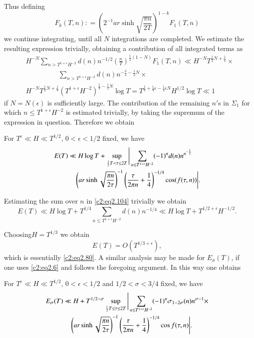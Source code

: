 Thus defining
$$ 
F_k (T, n) : = \left(2^{-1} ar \sinh \sqrt{\frac{\pi  n}{2T}}\right)^{1-k} F_1 (T, n)
$$
we continue integrating, until all $N$ integrations are completed. We
estimate the resulting expression trivially, obtaining a contribution
of all integrated terms as
\begin{align*}
  & H^{-N} \sum_{n > T^{1+ \epsilon} H^{-2}} d(n)n^{-1/2}
  \left(\frac{n}{T} \right)^{\frac{1}{2} (1-N)} F_1 (T, n) \ll H^{-N}T^{\frac{1}{2} N
    + \frac{1}{4}}\times\\ 
  & \hspace{2cm}\sum_{n > T^{1+ \epsilon} H^{-2}} d(n) n^{-\frac{3}{4} - \frac{1}{2} N}\times\\
  & H^{-N} T^{\frac{1}{2} N+ \frac{1}{4}}(T^{1+ \epsilon}H^{-2})^{\frac{1}{4} - \frac{1}{2} N} \log T
  = T^{\frac{1}{2} + \frac{1}{4} \epsilon - \frac{1}{2} \epsilon N} H^{1/2} \log T \ll 1 
\end{align*}
if $N= N(\epsilon)$ is sufficiently large. The contribution of the
remaining $n'$s in $\Sigma_1$ for which $n \leq T^{1+ \epsilon}
H^{-2}$ is estimated trivially, by taking the supremum of the
expression in question. Therefore we obtain

\begin{thm}\label{c2:thm2.7}
  For $T^\epsilon \ll H \ll T^{1/2}$, $0 < \epsilon < 1/2$ fixed, we
  have
\begin{align}
E(T)&\ll H \log T+  \sup\limits_{\frac{1}{2} T < \tau \leq 2T} 
\Bigg| \sum_{n \leq T^{1+\epsilon}H^{-2}} (-1)^n d(n) n^{n^{-\frac{1}{2}}}\notag\\
&\quad\left(ar \sinh\sqrt{\frac{\pi n}{2 \tau}} \right)^{-1}
\left(\frac{\tau}{2 \pi n} +  
\frac{1}{4}\right)^{-1/4} \cos (f(\tau, n)) \Bigg|.\label{c2:eq2.104}
\end{align}
\end{thm}

Estimating the sum over $n$ in \eqref{c2:eq2.104} trivially we obtain 
$$
E(T) \ll H \log T + T^{1/4} \sum_{n \leq T^{1+ \epsilon}H^{-2}} d(n)
n^{-1/4} \ll H \log T + T^{1/2 + \epsilon} H^{-1/2}.
$$

Choosing\pageoriginale $H= T^{1/3}$ we obtain
$$
E(T) = O(T^{1/3+ \epsilon}),
$$
which is essentially \eqref{c2:eq2.80}. A similar analysis may be made
for $E_\sigma (T)$, if one uses \eqref{c2:eq2.6} and follows the
foregoing argument. In this way one obtains

\begin{thm}\label{c2:thm2.8}
  For $T^\epsilon \ll H \ll T^{1/2}$, $0 < \epsilon < 1/2$ and $1/2 <
  \sigma < 3/4$ fixed, we have
{\fontsize{10}{12}\selectfont
  \begin{align}
E_\sigma (T)&\ll H + T^{1/2-\sigma} \sup\limits_{\frac{1}{2} T \leq \tau
      \leq 2 T}\Bigg|\sum_{n \leq T^{1+ \epsilon} H^{-2}} (-1)^n
    \sigma_{1-2\sigma} (n)  n^{\sigma-1}\times\notag\\ 
 &\quad\left(ar \sinh \sqrt{\frac{\pi
      n}{2 \tau}} \right)^{-1} \left(\frac{\tau}{2 \pi n}+ \frac{1}{4}
    \right)^{-1/4} \cos f(\tau, n) \Bigg|.\label{c2:eq2.105}
  \end{align}}
\end{thm}

